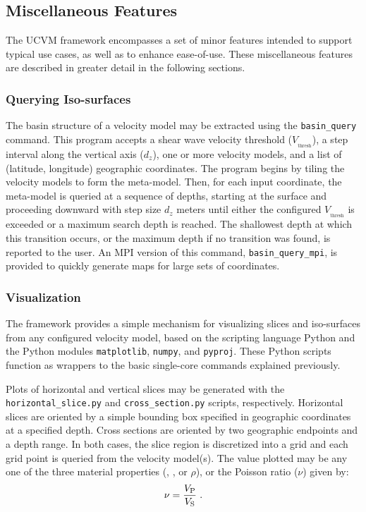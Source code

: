 \subsection{Miscellaneous Features}

The UCVM framework encompasses a set of minor features intended to support typical use cases, as well as to enhance ease-of-use. These miscellaneous features are described in greater detail in the following sections.

\subsubsection{Querying \vs{} Iso-surfaces}

The basin structure of a velocity model may be extracted using the \texttt{basin\_query} command. This program accepts a shear wave velocity threshold ($V_{_{\mathrm{thresh}}}$), a step interval along the vertical axis ($d_z$), one or more velocity models, and a list of (latitude, longitude) geographic coordinates. The program begins by tiling the velocity models to form the meta-model. Then, for each input coordinate, the meta-model is queried at a sequence of depths, starting at the surface and proceeding downward with step size $d_z$ meters until either the configured $V_{_{\mathrm{thresh}}}$ is exceeded or a maximum search depth is reached. The shallowest depth at which this transition occurs, or the maximum depth if no transition was found, is reported to the user. An MPI version of this command, \texttt{basin\_query\_mpi}, is provided to quickly generate maps for large sets of coordinates.

\subsubsection{Visualization}

The framework provides a simple mechanism for visualizing slices and iso-surfaces from any configured velocity model, based on the scripting language Python and the Python modules \texttt{matplotlib}, \texttt{numpy}, and \texttt{pyproj}. These Python scripts function as wrappers to the basic single-core commands explained previously.

Plots of horizontal and vertical slices may be generated with the \texttt{horizontal\_slice.py} and \texttt{cross\_section.py} scripts, respectively. Horizontal slices are oriented by a simple bounding box specified in geographic coordinates at a specified depth. Cross sections are oriented by two geographic endpoints and a depth range. In both cases, the slice region is discretized into a grid and each grid point is queried from the velocity model(s). The value plotted may be any one of the three material properties (\vp{}, \vs{}, or $\rho$), or the Poisson ratio ($\nu$) given by:
%
\begin{equation}
	\nu = \frac{ V_{\mathrm{P}} }{ V_{\mathrm{S}} }
	\hspace{0.3em}.
\end{equation}

